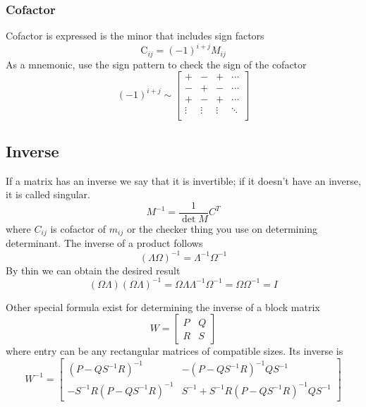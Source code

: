 \documentclass[../../../main.tex]{subfiles}
\begin{document}
\subsubsection{Cofactor}
Cofactor is expressed is the minor that includes sign factors
\begin{equation*}
	\text{C}_{ij}=(-1)^{i+j}M_{ij}
\end{equation*}
As a mnemonic, use the sign pattern to check the sign of the cofactor
\begin{equation*}
	(-1)^{i+j}\sim
	\begin{bmatrix}
		+      & -      & +      & \cdots \\
		-      & +      & -      & \cdots \\
		+      & -      & +      & \cdots \\
		\vdots & \vdots & \vdots & \ddots \\
	\end{bmatrix}
\end{equation*}

\subsection{Inverse}
If a matrix has an inverse we say that it is invertible; if it doesn't have an inverse, it is called singular.
\begin{equation*}
	M^{-1}=\frac{1}{\det M}C^{T}
\end{equation*}
where $C_{ij}$ is cofactor of $m_{ij}$ or the checker thing you use on determining determinant.
The inverse of a product follows
\begin{equation*}
	(\Lambda\Omega)^{-1}=\Lambda^{-1}\Omega^{-1}
\end{equation*}
By thin we can obtain the desired result
\begin{equation*}
	(\Omega\Lambda)(\Omega\Lambda)^{-1}=\Omega\Lambda\Lambda^{-1}\Omega^{-1}=\Omega\Omega^{-1}=I
\end{equation*}

Other special formula exist for determining the inverse of a block matrix
\begin{equation*}
	W = \begin{bmatrix} P & Q \\ R & S \end{bmatrix}
\end{equation*}
where entry can be any rectangular matrices of compatible sizes.
Its inverse is
\begin{equation*}
	W^{-1} = \begin{bmatrix} (P - QS^{-1}R)^{-1} & -(P - QS^{-1}R)^{-1}QS^{-1} \\ -S^{-1}R(P - QS^{-1}R)^{-1} & S^{-1} + S^{-1}R(P - QS^{-1}R)^{-1}QS^{-1} \end{bmatrix}
\end{equation*}
\end{document}

